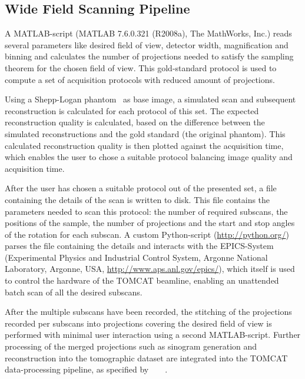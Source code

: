 \subsection{Wide Field Scanning Pipeline}
\label{subsec:wfs-setup}
A MATLAB-script (MATLAB\textsuperscript{\textregistered} 7.6.0.321 (R2008a), The MathWorks, Inc.) reads several parameters like desired field of view, detector width, magnification and binning and calculates the number of projections needed to satisfy the sampling theorem for the chosen field of view. This gold-standard protocol is used to compute a set of acquisition protocols with reduced amount of projections.

Using a Shepp-Logan phantom~\cite{Shepp1974} as base image, a simulated scan and subsequent reconstruction is calculated for each protocol of this set. The expected reconstruction quality is calculated, based on the difference between the simulated reconstructions and the gold standard (the original phantom). This calculated reconstruction quality is then plotted against the acquisition time, which enables the user to chose a suitable protocol balancing image quality and acquisition time.

After the user has chosen a suitable protocol out of the presented set, a file containing the details of the scan is written to disk. This file contains the parameters needed to scan this protocol: the number of required subscans, the positions of the sample, the number of projections and the start and stop angles of the rotation for each subscan. A custom Python-script (\url{http://python.org/}) parses the file containing the details and interacts with the EPICS-System (Experimental Physics and Industrial Control System, Argonne National Laboratory, Argonne, USA, \url{http://www.aps.anl.gov/epics/}), which itself is used to control the hardware of the TOMCAT beamline, enabling an unattended batch scan of all the desired subscans.

After the multiple subscans have been recorded, the stitching of the projections recorded per subscans into projections covering the desired field of view is performed with minimal user interaction using a second MATLAB-script. Further processing of the merged projections such as sinogram generation and reconstruction into the tomographic dataset are integrated into the TOMCAT data-processing pipeline, as specified by%
\ifhtml%
	~\citet{Hintermueller2009}%
\else%
	~%
\fi%
.

